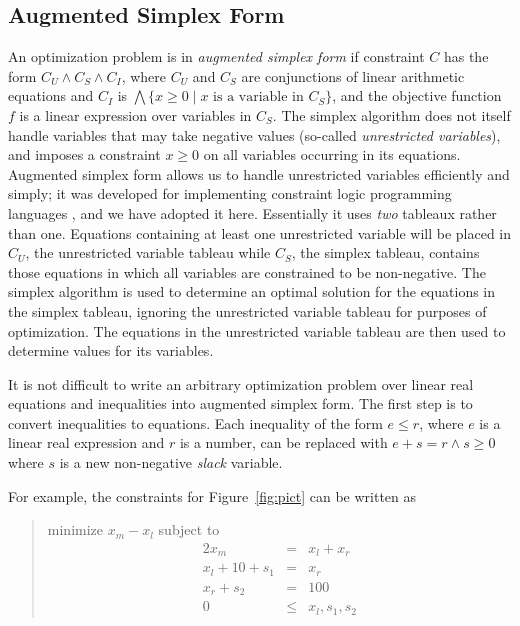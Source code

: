 \documentclass{uist96}
\begin{document}
\subsection{Augmented Simplex Form}
\label{augmented-simplex-form}

An optimization problem is in \emph{augmented simplex form} if constraint
$C$ has the form $C_U \wedge C_S \wedge C_I$, where $C_U$ and $C_S$ are
conjunctions of linear arithmetic equations and $C_I$ is 
\mbox{$\bigwedge \{ x
\geq 0 \mid \mbox{$x$ is a variable in $C_S$}\}$}, and 
the objective function $f$ is a linear
expression over variables in $C_S$\@.  The simplex algorithm does not itself
handle variables that may take negative values (so-called {\em
unrestricted variables}), and imposes a constraint $x \geq 0$ on all
variables occurring in its equations.  Augmented simplex form allows us to
handle unrestricted variables efficiently and simply; it was developed for
implementing constraint logic programming languages
\cite{marriott-stuckey-book}, and we have adopted it here.  Essentially it
uses {\em two} tableaux rather than one.  
Equations containing at least one unrestricted
variable will be placed in $C_U$, the unrestricted variable tableau while
$C_S$, the simplex tableau, contains those equations in 
which all variables are constrained to be
non-negative.  The simplex algorithm is used to determine an optimal
solution for the equations in the simplex tableau, ignoring the
unrestricted variable tableau for purposes of optimization.  The equations
in the unrestricted variable tableau are then used to determine values for
its variables.

It is not difficult to write an arbitrary optimization problem over linear
real equations and inequalities into augmented simplex form.  The first
step is to convert inequalities to equations.  Each inequality of the form
$e \leq r$, where $e$ is a linear real expression and $r$ is a number, can be
replaced with $e + s = r \wedge s \geq 0$ where $s$ is a new non-negative
\emph{slack} variable.

For example, the constraints for Figure~\ref{fig:pict} can be written as
\begin{quote}\vspace*{-1ex}
minimize $x_m - x_l$ 
subject to 
$$\begin{array}{rcl}
2 x_m & = & x_l + x_r \\
x_l + 10 + s_1& = &x_r \\
x_r + s_2 &= &100 \\
0 &\leq & x_l, s_1, s_2
\end{array}$$
\end{quote}\vspace{-0.9ex}
\end{document}
